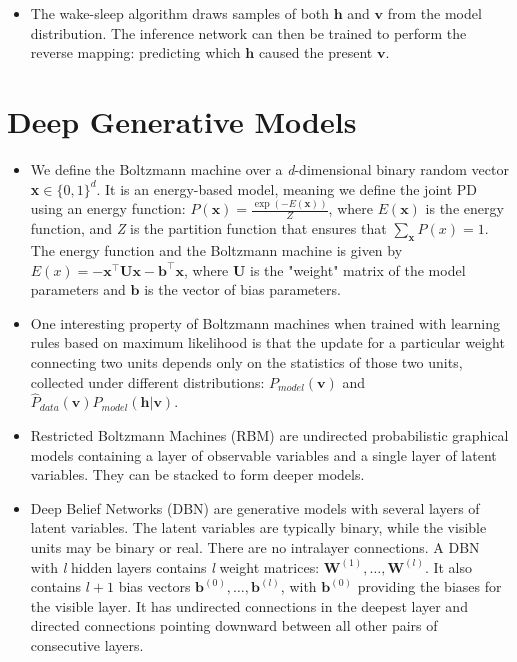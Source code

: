 \documentclass{article}
\begin{document}
\begin{itemize}
\item The wake-sleep algorithm draws samples of both \(\boldsymbol{h}\) and \(\boldsymbol{v}\) from the model distribution. The inference network can then be trained to perform the reverse mapping: predicting which \(\boldsymbol{h}\) caused the present \(\boldsymbol{v}\).
\end{itemize}

\section{Deep Generative Models}
\begin{itemize}
\item We define the Boltzmann machine over a \textit{d}-dimensional binary random vector \textbf{x}\( \in \{0,1\}^d\). It is an energy-based model, meaning we define the joint PD using an energy function: \(P(\boldsymbol{x}) = \frac{\exp{(-E(\boldsymbol{x}))}}{Z}\), where \(E(\boldsymbol{x})\) is the energy function, and \textit{Z} is the partition function that ensures that \(\sum_{\boldsymbol{x}}P(x)=1\). The energy function and the Boltzmann machine is given by \(E(x) = -\boldsymbol{x}^{\top}\boldsymbol{Ux}-\boldsymbol{b}^{\top}\boldsymbol{x}\), where \(\boldsymbol{U}\) is the "weight" matrix of the model parameters and \(\boldsymbol{b}\) is the vector of bias parameters.
\item One interesting property of Boltzmann machines when trained with learning rules based on maximum likelihood is that the update for a particular weight connecting two units depends only on the statistics of those two units, collected under different distributions: \(P_{model}(\boldsymbol{v})\) and \(\hat{P}_{data}(\boldsymbol{v})P_{model}(\boldsymbol{h}|\boldsymbol{v})\).
\item Restricted Boltzmann Machines (RBM) are undirected probabilistic graphical models containing a layer of observable variables and a single layer of latent variables. They can be stacked to form deeper models.
\item Deep Belief Networks (DBN) are generative models with several layers of latent variables. The latent variables are typically binary, while the visible units may be binary or real. There are no intralayer connections. A DBN with \textit{l} hidden layers contains \textit{l} weight matrices: \(\boldsymbol{W}^{(1)},\dots,\boldsymbol{W}^{(l)}\). It also contains \(l+1\) bias vectors \(\boldsymbol{b}^{(0)},\dots,\boldsymbol{b}^{(l)}\), with \(\boldsymbol{b}^{(0)}\) providing the biases for the visible layer. It has undirected connections in the deepest layer and directed connections pointing downward between all other pairs of consecutive layers.

\end{itemize}
\end{document}
